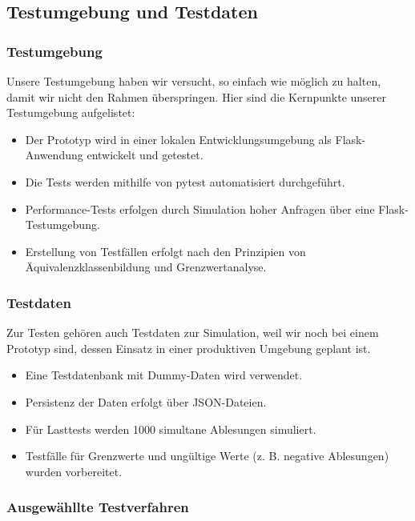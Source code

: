\subsection{Testumgebung und Testdaten}

\subsubsection{Testumgebung}

Unsere Testumgebung haben wir versucht, so einfach wie möglich zu halten, damit wir nicht den Rahmen überspringen.
Hier sind die Kernpunkte unserer Testumgebung aufgelistet:
\begin{itemize}
	\item Der Prototyp wird in einer lokalen Entwicklungsumgebung als Flask-Anwendung entwickelt und getestet.
	\item Die Tests werden mithilfe von pytest automatisiert durchgeführt.
    \item Performance-Tests erfolgen durch Simulation hoher Anfragen über eine Flask-Testumgebung.
	\item Erstellung von Testfällen erfolgt nach den Prinzipien von Äquivalenzklassenbildung und Grenzwertanalyse.
\end{itemize}

\subsubsection{Testdaten}

Zur Testen gehören auch Testdaten zur Simulation, weil wir noch bei einem Prototyp sind, dessen Einsatz in einer produktiven Umgebung geplant ist.

\begin{itemize}
	\item Eine Testdatenbank mit Dummy-Daten wird verwendet.
	\item Persistenz der Daten erfolgt über JSON-Dateien.
	\item Für Lasttests werden 1000 simultane Ablesungen simuliert.
    \item Testfälle für Grenzwerte und ungültige Werte (z. B. negative Ablesungen) wurden vorbereitet.
\end{itemize}

\subsubsection{Ausgewähllte Testverfahren}


